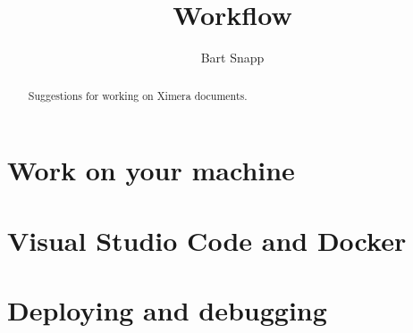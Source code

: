 \documentclass{ximera}
\title{Workflow}
\author{Bart Snapp}
\begin{document}
\begin{abstract}
    Suggestions for working on Ximera documents.
\end{abstract}
\maketitle

\section{Work on your machine}



\section{Visual Studio Code and Docker}

\section{Deploying and debugging}
\end{document}
